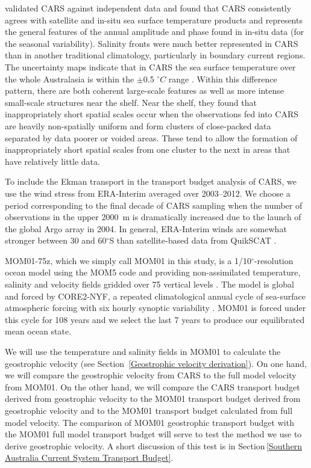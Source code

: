 \documentclass[preprint,3p,review,12pt]{elsarticle}
\newcommand{\dg}{$^{\circ}$}
\begin{document}
\citet{Ridgway2002} validated CARS against independent data and found that CARS consistently agrees with satellite and in-situ sea surface temperature products and represents the general features of the annual amplitude and phase found in in-situ data (for the seasonal variability). Salinity fronts were much better represented in CARS than in another traditional climatology, particularly in boundary current regions. The uncertainty maps indicate that in CARS the sea surface temperature over the whole Australasia is within the $\pm$0.5 $^{\circ}C$ range \citep{Ridgway2002}. Within this difference pattern, there are both coherent large-scale features as well as more intense small-scale structures near the shelf. Near the shelf, they found that inappropriately short spatial scales occur when the observations fed into CARS are heavily non-spatially uniform and form clusters of close-packed data separated by data poorer or voided areas. These tend to allow the formation of inappropriately short spatial scales from one cluster to the next in areas that have relatively little data.

To include the Ekman transport in the transport budget analysis of CARS, we use the wind stress from ERA-Interim \citep{Dee2011} averaged over 2003--2012. We choose a period corresponding to the final decade of CARS sampling when the number of observations in the upper \SI{2000}{m} is dramatically increased due to the launch of the global Argo array in 2004. In general, ERA-Interim winds are somewhat stronger between 30 and 60\dg S than satellite-based data from QuikSCAT \citep{Chaudhuri2013}.

MOM01-75z, which we simply call MOM01 in this study, is a 1/10\dg-resolution ocean model using the MOM5 code \citep{Griffies2012} and providing non-assimilated temperature, salinity and velocity fields gridded over 75 vertical levels \citep{Stewart2017}.
The model is global and forced by CORE2-NYF, a repeated climatological annual cycle of sea-surface atmospheric forcing with six hourly synoptic variability \citep{Large2009}.
MOM01 is forced under this cycle for 108 years and we select the last 7 years to produce our equilibrated mean ocean state. 

We will use the temperature and salinity fields in MOM01 to calculate the geostrophic velocity (see Section~\ref{Geostrophic velocity derivation}). On one hand, we will compare the geostrophic velocity from CARS to the full model velocity from MOM01. On the other hand, we will compare the CARS transport budget derived from geostrophic velocity to the MOM01 transport budget derived from geostrophic velocity and to the MOM01 transport budget calculated from full model velocity. The comparison of MOM01 geostrophic transport budget with the MOM01 full model transport budget will serve to test the method we use to derive geostrophic velocity. A short discussion of this test is in Section\,\ref{Southern Australia Current System Transport Budget}.
\end{document}
